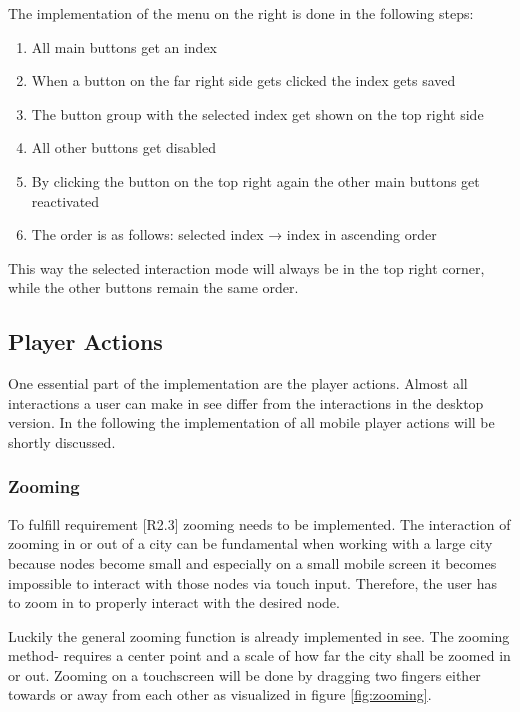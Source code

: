 The implementation of the menu on the right is done in the following steps:
\begin{enumerate}
    \item All main buttons get an index
    \item When a button on the far right side gets clicked the index gets saved
    \item The button group with the selected index get shown on the top right side
    \item All other buttons get disabled
    \item By clicking the button on the top right again the other main buttons get reactivated 
    \item The order is as follows: selected index → index in ascending order
\end{enumerate} 
This way the selected interaction mode will always be in the top right corner, while the other buttons remain the same order.

\subsection{Player Actions}
\label{sec:player_actions}

One essential part of the implementation are the player actions. 
Almost all interactions a user can make in \gls{see} differ from the interactions in the desktop version.
In the following the implementation of all mobile player actions will be shortly discussed.

\subsubsection{Zooming}
To fulfill requirement [R2.3] zooming needs to be implemented.
The interaction of zooming in or out of a \gls{city} can be fundamental when working with a large \gls{city} because \glspl{node} become small and especially on a small mobile screen it becomes impossible to interact with those nodes via touch input. 
Therefore, the user has to zoom in to properly interact with the desired node.

Luckily the general zooming function is already implemented in \gls{see}.
The zooming method- requires a center point and a scale of how far the \gls{city} shall be zoomed in or out.
Zooming on a touchscreen will be done by dragging two fingers either towards or away from each other as visualized in figure \ref{fig:zooming}.


